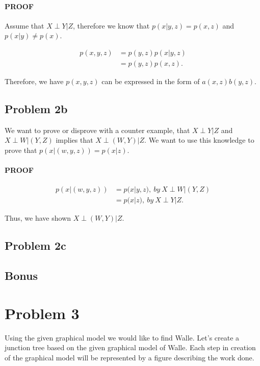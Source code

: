 \documentclass[paper=a4, fontsize=11pt]{scrartcl} %
\begin{document}
\paragraph{PROOF}
Assume that $X \perp Y|Z$, therefore we know that $p(x|y,z) = p(x,z)$ and $p(x|y) \neq p(x)$.

\begin{align}
p(x,y,z) &= p(y,z)p(x|y,z) \\
&= p(y,z)p(x,z).
\end{align}

Therefore, we have $p(x,y,z)$ can be expressed in the form of $a(x,z)b(y,z)$.

\subsection{Problem 2b}
 We want to prove or disprove with a counter example, that $X \perp Y|Z$ and $X \perp W|(Y,Z)$ implies that $X \perp (W,Y)|Z$.
We want to use this knowledge to prove that $p(x|(w,y,z)) = p(x|z)$.

\paragraph{PROOF}
\begin{align}
p(x|(w,y,z)) &= p(x|y,z),\ by \ X \perp W|(Y,Z) \\
&= p(x|z), \ by \  X \perp Y|Z.
\end{align}

Thus, we have shown $X \perp (W,Y)|Z$.

\subsection{Problem 2c}


\subsection{Bonus}


\section{Problem 3}
Using the given graphical model we would like to find Walle.  
Let's create a junction tree based on the given graphical model of Walle.
Each step in creation of the graphical model will be represented by a figure describing the work done. 
\end{document}
